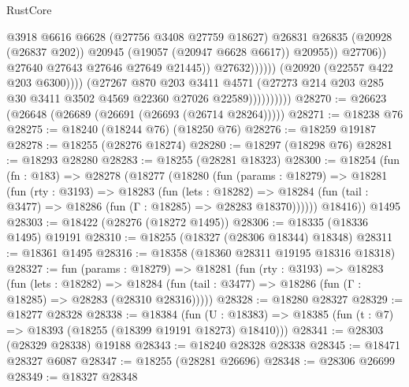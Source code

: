 \begin{lexlean}{RustCore}
\begin{coremodule}
                                                @3918
                                                @6616
                                                @6628
                                                (@27756 @3408 @27759 @18627)
                                                @26831
                                                @26835
                                                (@20928 (@26837 @202))
                                                @20945
                                                (@19057 (@20947 @6628 @6617))
                                                @20955))
                                            @27706))
                                        @27640
                                        @27643
                                        @27646
                                        @27649
                                        @21445))
                                    @27632))))))
                        (@20920 (@22557 @422 @203 @6300))))
                    (@27267
                      @870
                      @203
                      @3411
                      @4571
                      (@27273 @214 @203 @285 @30 @3411 @3502 @4569 @22360 @27026 @22589))))))))))
@28270 := @26623 (@26648 (@26689 (@26691 (@26693 (@26714 @28264)))))
@28271 := @18238 @76
@28275 := @18240 (@18244 @76) (@18250 @76)
@28276 := @18259 @19187
@28278 := @18255 (@28276 @18274)
@28280 := @18297 (@18298 @76)
@28281 := @18293 @28280
@28283 := @18255 (@28281 @18323)
@28300 := @18254
    (fun (fn : @183) =>
    @28278
      (@18277
        (@18280
          (fun (params : @18279) =>
          @18281
            (fun (rty : @3193) =>
            @18283
              (fun (lets : @18282) =>
              @18284 (fun (tail : @3477) => @18286 (fun (Γ : @18285) => @28283 @18370))))))
        @18416))
    @1495
@28303 := @18422 (@28276 (@18272 @1495))
@28306 := @18335 (@18336 @1495) @19191
@28310 := @18255 (@18327 (@28306 @18344) @18348)
@28311 := @18361 @1495
@28316 := @18358 (@18360 @28311 @19195 @18316 @18318)
@28327 := fun (params : @18279) =>
  @18281
    (fun (rty : @3193) =>
    @18283
      (fun (lets : @18282) =>
      @18284 (fun (tail : @3477) => @18286 (fun (Γ : @18285) => @28283 (@28310 @28316)))))
@28328 := @18280 @28327
@28329 := @18277 @28328
@28338 := @18384
    (fun (U : @18383) => @18385 (fun (t : @7) => @18393 (@18255 (@18399 @19191 @18273) @18410)))
@28341 := @28303 (@28329 @28338) @19188
@28343 := @18240 @28328 @28338
@28345 := @18471 @28327 @6087
@28347 := @18255 (@28281 @26696)
@28348 := @28306 @26699
@28349 := @18327 @28348

\end{coremodule}
\end{lexlean}
